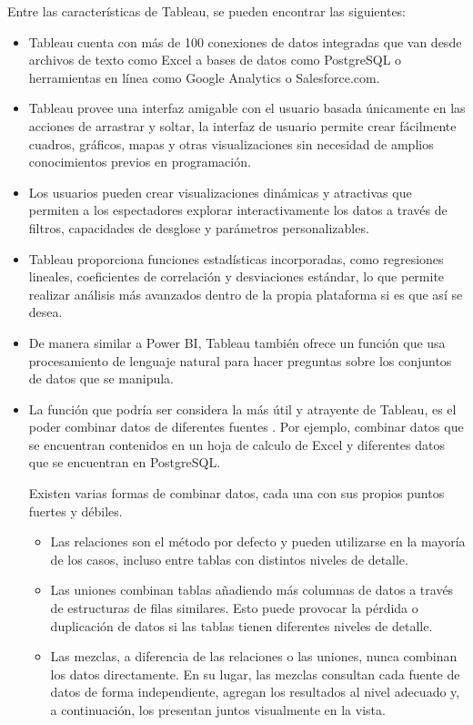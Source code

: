 Entre las características de Tableau, se pueden encontrar las siguientes:
\begin{itemize}
    \item Tableau cuenta con más de 100 conexiones de datos integradas que van desde archivos de texto como Excel a bases de datos como PostgreSQL o herramientas en línea como Google Analytics o Salesforce.com.

    \item Tableau provee una interfaz amigable con el usuario basada únicamente en las acciones de arrastrar y soltar, la interfaz de usuario permite crear fácilmente cuadros, gráficos, mapas y otras visualizaciones sin necesidad de amplios conocimientos previos en programación.

    \item Los usuarios pueden crear visualizaciones dinámicas y atractivas que permiten a los espectadores explorar interactivamente los datos a través de filtros, capacidades de desglose y parámetros personalizables.

    \item Tableau proporciona funciones estadísticas incorporadas, como regresiones lineales, coeficientes de correlación y desviaciones estándar, lo que permite realizar análisis más avanzados dentro de la propia plataforma si es que así se desea.

    \item De manera similar a Power BI, Tableau también ofrece un función que usa procesamiento de lenguaje natural para hacer preguntas sobre los conjuntos de datos que se manipula.

    \item La función que podría ser considera la más útil y atrayente de Tableau, es el poder combinar datos de diferentes fuentes \cite{tableau_help_multiple_connections}. Por ejemplo, combinar datos que se encuentran contenidos en un hoja de calculo de Excel y diferentes datos que se encuentran en PostgreSQL.

    Existen varias formas de combinar datos, cada una con sus propios puntos fuertes y débiles.

    \begin{itemize}
        \item Las relaciones son el método por defecto y pueden utilizarse en la mayoría de los casos, incluso entre tablas con distintos niveles de detalle.

        \item Las uniones combinan tablas añadiendo más columnas de datos a través de estructuras de filas similares. Esto puede provocar la pérdida o duplicación de datos si las tablas tienen diferentes niveles de detalle.

        \item Las mezclas, a diferencia de las relaciones o las uniones, nunca combinan los datos directamente. En su lugar, las mezclas consultan cada fuente de datos de forma independiente, agregan los resultados al nivel adecuado y, a continuación, los presentan juntos visualmente en la vista.
    \end{itemize}

\end{itemize}

